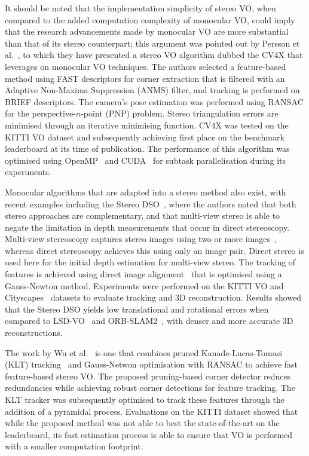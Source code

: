 It should be noted that the implementation simplicity of stereo VO, when compared to the added computation complexity of monocular VO, could imply that the research advancements made by monocular VO are more substantial than that of its stereo counterpart; this argument was pointed out by Persson et al.~\cite{persson_robust_2015}, to which they have presented a stereo VO algorithm dubbed the CV4X that leverages on monocular VO techniques. The authors selected a feature-based method using FAST descriptors for corner extraction that is filtered with an Adaptive Non-Maxima Suppression (ANMS) filter, and tracking is performed on BRIEF descriptors. The camera's pose estimation was performed using RANSAC for the perspective-$n$-point (PNP) problem. Stereo triangulation errors are minimised through an iterative minimising function. CV4X was tested on the KITTI VO dataset and subsequently achieving first place on the benchmark leaderboard at its time of publication. The performance of this algorithm was optimised using OpenMP~\cite{openmp_openmp_nodate} and CUDA~\cite{nvidia_corporation_parallel_2016} for subtask parallelisation during its experiments. 


Monocular algorithms that are adapted into a stereo method also exist, with recent examples including the Stereo DSO~\cite{wang_stereo_2017}, where the authors noted that both stereo approaches are complementary, and that multi-view stereo is able to negate the limitation in depth measurements that occur in direct stereoscopy. Multi-view stereoscopy captures stereo images using two or more images~\cite{furukawa_multi-view_2015}, whereas direct stereoscopy achieves this using only an image pair. Direct stereo is used here for the initial depth estimation for multi-view stereo. The tracking of features is achieved using direct image alignment~\cite{forster_svo:_2017} that is optimised using a Gauss-Newton method. Experiments were performed on the KITTI VO and Cityscapes~\cite{cordts_cityscapes_2016} datasets to evaluate tracking and 3D reconstruction. Results showed that the Stereo DSO yields low translational and rotational errors when compared to LSD-VO~\cite{engel_lsd-slam:_2014} and ORB-SLAM2~\cite{mur-artal_orb-slam2:_2017}, with denser and more accurate 3D reconstructions. 

The work by Wu et al.~\cite{wu_framework_2017} is one that combines pruned Kanade-Lucas-Tomasi (KLT) tracking~\cite{tomasi_detection_1991} and Gauss-Netwon optimisation with RANSAC to achieve fast feature-based stereo VO. The proposed pruning-based corner detector reduces redundancies while achieving robust corner detections for feature tracking. The KLT tracker was subsequently optimised to track these features through the addition of a pyramidal process. Evaluations on the KITTI dataset showed that while the proposed method was not able to best the state-of-the-art on the leaderboard, its fast estimation process is able to ensure that VO is performed with a smaller computation footprint. 

